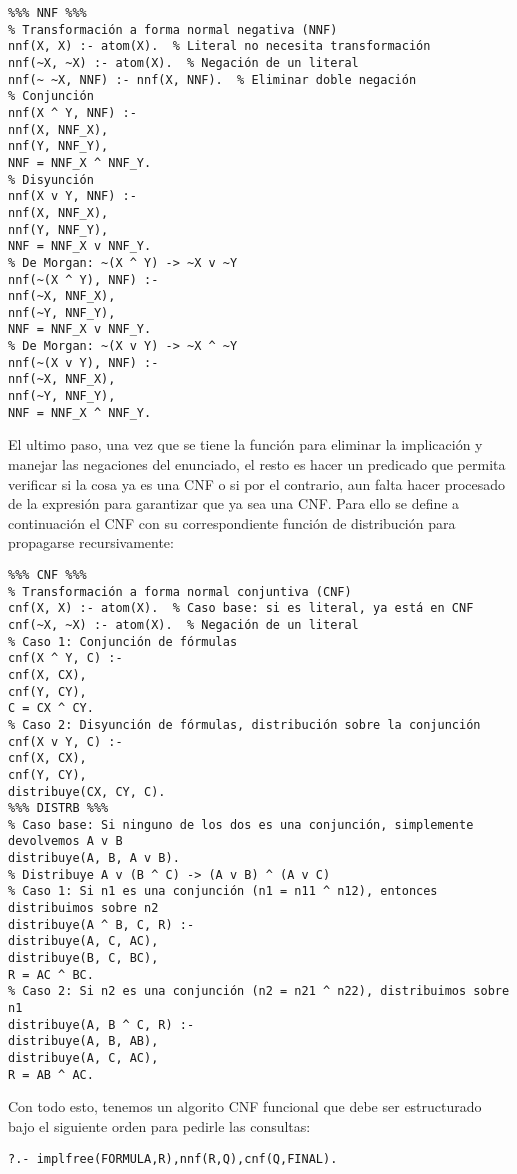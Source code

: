 \documentclass[11pt, letterpaper]{article}
\begin{document}
\begin{verbatim}
%%% NNF %%%
% Transformación a forma normal negativa (NNF)
nnf(X, X) :- atom(X).  % Literal no necesita transformación
nnf(~X, ~X) :- atom(X).  % Negación de un literal
nnf(~ ~X, NNF) :- nnf(X, NNF).  % Eliminar doble negación
% Conjunción
nnf(X ^ Y, NNF) :- 
nnf(X, NNF_X),
nnf(Y, NNF_Y),
NNF = NNF_X ^ NNF_Y.  
% Disyunción
nnf(X v Y, NNF) :- 
nnf(X, NNF_X),
nnf(Y, NNF_Y),
NNF = NNF_X v NNF_Y.  
% De Morgan: ~(X ^ Y) -> ~X v ~Y
nnf(~(X ^ Y), NNF) :- 
nnf(~X, NNF_X),
nnf(~Y, NNF_Y),
NNF = NNF_X v NNF_Y.  
% De Morgan: ~(X v Y) -> ~X ^ ~Y
nnf(~(X v Y), NNF) :- 
nnf(~X, NNF_X),
nnf(~Y, NNF_Y),
NNF = NNF_X ^ NNF_Y.  

\end{verbatim}

\newpage

El ultimo paso, una vez que se tiene la función para eliminar la implicación y manejar las negaciones del enunciado, el resto es hacer un predicado que permita verificar si la cosa ya es una CNF o si por el contrario, aun falta hacer procesado de la expresión para garantizar que ya sea una CNF. Para ello se define a continuación el CNF con su correspondiente función de distribución para propagarse recursivamente:

\begin{verbatim}
%%% CNF %%%
% Transformación a forma normal conjuntiva (CNF)
cnf(X, X) :- atom(X).  % Caso base: si es literal, ya está en CNF
cnf(~X, ~X) :- atom(X).  % Negación de un literal
% Caso 1: Conjunción de fórmulas
cnf(X ^ Y, C) :- 
cnf(X, CX),
cnf(Y, CY),
C = CX ^ CY.
% Caso 2: Disyunción de fórmulas, distribución sobre la conjunción
cnf(X v Y, C) :- 
cnf(X, CX),
cnf(Y, CY),
distribuye(CX, CY, C).
%%% DISTRB %%%
% Caso base: Si ninguno de los dos es una conjunción, simplemente devolvemos A v B
distribuye(A, B, A v B).
% Distribuye A v (B ^ C) -> (A v B) ^ (A v C)
% Caso 1: Si n1 es una conjunción (n1 = n11 ^ n12), entonces distribuimos sobre n2
distribuye(A ^ B, C, R) :-
distribuye(A, C, AC),
distribuye(B, C, BC),
R = AC ^ BC.
% Caso 2: Si n2 es una conjunción (n2 = n21 ^ n22), distribuimos sobre n1
distribuye(A, B ^ C, R) :-
distribuye(A, B, AB),
distribuye(A, C, AC),
R = AB ^ AC.
\end{verbatim}

Con todo esto, tenemos un algorito CNF funcional que debe ser estructurado bajo el siguiente orden para pedirle las consultas:

\begin{verbatim}
?.- implfree(FORMULA,R),nnf(R,Q),cnf(Q,FINAL).

\end{verbatim}
\end{document}
